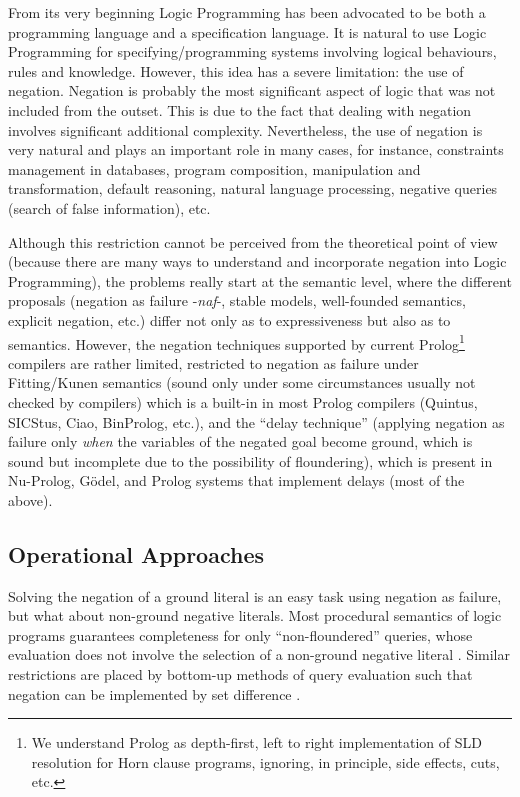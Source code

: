 \documentclass{tlp}
\newcommand{\naf}{{\em naf}}\newcommand{\viejo}[1]{}
\begin{document}
From its very beginning Logic Programming has been advocated to be
both a programming language and a specification language. It is
natural to use Logic Programming for specifying/programming systems
involving logical behaviours, rules and knowledge. However, this idea
has a severe limitation: the use of negation. Negation is probably the
most significant aspect of logic that was not included from the
outset. This is due to the fact that dealing with negation involves
significant additional complexity. Nevertheless, the use of negation
is very natural and plays an important role in many cases, for
instance, constraints management in databases, program composition,
manipulation and transformation, default reasoning, natural language
processing, negative queries (search of false information), etc.


Although this restriction cannot be perceived from the theoretical
point of view (because there are many ways to understand and
incorporate negation into Logic Programming), the problems really
start at the semantic level, where the different proposals (negation
as failure -\naf-, stable models, well-founded semantics, explicit
negation, etc.)  differ not only as to expressiveness but also as to
semantics.  However, the negation techniques supported by current
Prolog\footnote{We understand Prolog as depth-first, left to
right implementation of SLD resolution for Horn clause programs,
ignoring, in principle, side effects, cuts, etc.}  compilers are
rather limited, restricted to negation as failure under Fitting/Kunen
semantics \cite{Kunen} (sound only under some circumstances usually
not checked by compilers) which is a built-in in most
Prolog compilers (Quintus, SICStus, Ciao, BinProlog, etc.), and the
``delay technique'' (applying negation as failure only \emph{when} the
variables of the negated goal become ground, which is sound but
incomplete due to the possibility of floundering), which is present in
Nu-Prolog, G\"odel, and Prolog systems that implement delays (most of
the above).

\subsection{Operational Approaches}

Solving the negation of a ground literal is an easy task using
negation as failure, but what about non-ground negative
literals. Most procedural semantics of logic programs guarantees
completeness for only ``non-floundered'' queries, whose evaluation
does not involve the selection of a non-ground negative literal
\cite{Bol,Chen,Przymusinski1,Ross}. Similar restrictions are placed
by bottom-up methods of query evaluation such that negation can be
implemented by set difference \cite{Naughton,Stuckey93}.
\end{document}
